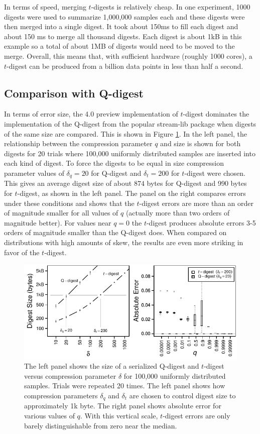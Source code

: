 \documentclass[]{statsoc}
\begin{document}
In terms of speed, merging $t$-digests is relatively cheap. In one experiment, 1000 digests were used to summarize 1,000,000 samples each and these digests were then merged into a single digest. It took about 150ms to fill each digest and about 150 ms to merge all thousand digests. Each digest is about 1kB in this example so a total of about 1MB of digests would need to be moved to the merge. Overall, this means that, with sufficient hardware (roughly 1000 cores), a $t$-digest can be produced from a billion data points in less than half a second. 

\subsection{Comparison with Q-digest}
In terms of error size, the 4.0 preview implementation of $t$-digest dominates the implementation of the Q-digest\cite{qdigest} from the popular stream-lib package \cite{github:stream} when digests of the same size are compared.  This is shown in Figure \ref{fig:qd-comparison}.  In the left panel, the relationship between the compression parameter $q$ and size is shown for both digests for 20 trials where 100,000 uniformly distributed samples are inserted into each kind of digest.  To force the digests to be equal in size compression parameter values of $\delta_q=20$ for Q-digest  and $\delta_t = 200$ for $t$-digest were chosen. This gives an average digest size of about $874$ bytes for Q-digest and 990 bytes for $t$-digest, as shown in the left panel. The panel on the right compares errors under these conditions and shows that the $t$-digest errors are more than an order of magnitude smaller for all values of $q$ (actually more than two orders of magnitude better). For values near $q=0$ the $t$-digest produces absolute errors 3-5 orders of magnitude smaller than the Q-digest does. When compared on distributions with high amounts of skew, the results are even more striking in favor of the $t$-digest.
\begin{figure}[htb] %
   \centering
   \includegraphics[width=4.5in]{figures/qd-sizes.pdf} 
   \caption{The left panel shows the size of a serialized Q-digest and $t$-digest versus compression parameter $\delta$ for 100,000 uniformly distributed samples. Trials were repeated 20 times. The left panel shows how compression parameters $\delta_q$ and $\delta_t$ are chosen to control digest size to approximately 1k byte. The right panel shows absolute error for various values of $q$.  With this vertical scale, $t$-digest errors are only barely distinguishable from zero near the median.  }
   \label{fig:qd-comparison}
\end{figure}
\end{document}
